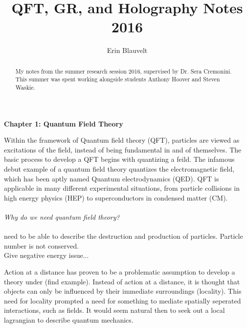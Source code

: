 \documentclass[aps,secnumarabic,nobalancelastpage,amsmath,amssymb,
nofootinbib]{revtex4}
\begin{document}
\large
\title{\LARGE QFT, GR, and Holography Notes 2016 \vspace{3mm}}

\author         {Erin Blauvelt}

\begin{abstract}
My notes from the summer research session 2016, supervised by Dr. Sera Cremonini. This summer was spent working alongside students Anthony Hoover and Steven Waskie.
\vspace{1mm}
\end{abstract}
\maketitle


\begin{center}
\textbf{\Large Chapter 1: Quantum Field Theory}
\end{center}
\indent \indent Within the framework of Quantum field theory (QFT), particles are viewed as excitations of the field, instead of being fundamental in and of themselves. The basic process to develop a QFT begins with quantizing a feild. The infamous debut example of a quantum field theory quantizes the electromagnetic field, which has been aptly named Quantum electrodynamics (QED). QFT is applicable in many different experimental situations, from particle collisions in high energy physics (HEP) to superconductors in condensed matter (CM).
\\\\
\noindent \textit{Why do we need quantum field theory?}
\\\\
\indent need to be able to describe the destruction and production of particles. Particle number is not conserved.\\
Give negative energy issue...

\indent Action at a distance has proven to be a problematic assumption to develop a theory under (find example). Instead of action at a distance, it is thought that objects can only be influenced by their immediate surroundings (locality). This need for locality prompted a need for something to mediate spatially seperated interactions, such as fields. It would seem natural then to seek out  a local lagrangian to describe quantum mechanics. 
\end{document}
